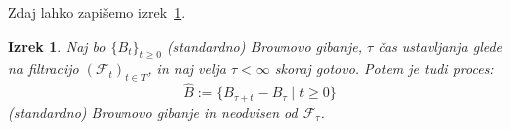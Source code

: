 \documentclass[11pt]{article}
\newcommand{\f}{\mathcal{F}}
\theoremstyle{definition}
\theoremstyle{plain}
\newtheorem{izrek}{Izrek}
\begin{document}
    
    Zdaj lahko zapišemo izrek~\ref{thm:stopped_brownian}. %
    
    \begin{izrek}
        \label{thm:stopped_brownian}
        Naj bo \(\{B_t\}_{t \geq 0}\) (standardno) Brownovo gibanje, \(\tau\) čas ustavljanja glede na
        filtracijo \((\f_t)_{t \in T}\), in naj velja \(\tau < \infty\) skoraj gotovo.
        Potem je tudi proces:
        \[
        \hat{B} := \{B_{\tau+t} - B_\tau \mid t \geq 0\}
        \]
        (standardno) Brownovo gibanje in neodvisen od \(\f_\tau\).
    \end{izrek}
    


\end{document}
